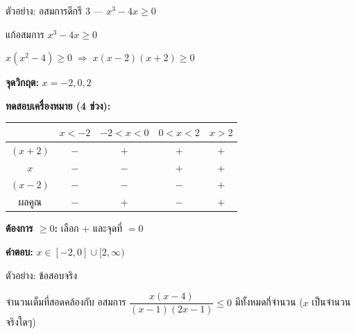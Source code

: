 \documentclass[11pt, aspectratio=169]{beamer}
\begin{document}
\begin{frame}{ตัวอย่าง: อสมการดีกรี 3 — $x^3 - 4x \geq 0$}
  \begin{exambox}
    แก้อสมการ $x^3 - 4x \geq 0$
  \end{exambox}

  \begin{solbox}
    $x(x^2 - 4) \geq 0 \;\Rightarrow\; x(x-2)(x+2) \geq 0$

    \textbf{จุดวิกฤต:} $x = -2, 0, 2$

    \textbf{ทดสอบเครื่องหมาย (4 ช่วง):}

    \small
    \begin{tabular}{c|cccc}
                     & $x<-2$ & $-2<x<0$ & $0<x<2$ & $x>2$ \\
      \hline
      $(x+2)$        & $-$    & $+$      & $+$     & $+$   \\
      $x$            & $-$    & $-$      & $+$     & $+$   \\
      $(x-2)$        & $-$    & $-$      & $-$     & $+$   \\
      \hline
      ผลคูณ          & $-$    & $+$      & $-$     & $+$
    \end{tabular}
    \normalsize

    \textbf{ต้องการ $\geq 0$:} เลือก $+$ และจุดที่ $=0$

    \textbf{คำตอบ:} $x \in [-2, 0] \cup [2, \infty)$
  \end{solbox}
\end{frame}

\begin{frame}{ตัวอย่าง: ข้อสอบจริง}
  \begin{exambox}[ข้อสอบปี 65 ข้อ 43]
    จำนวนเต็มที่สอดคล้องกับ อสมการ $\dfrac{x(x-4)}{(x-1)(2x-1)} \leq 0$ มีทั้งหมดกี่จำนวน ($x$ เป็นจำนวนจริงใดๆ)
  \end{exambox}
  
\end{frame}
\end{document}
